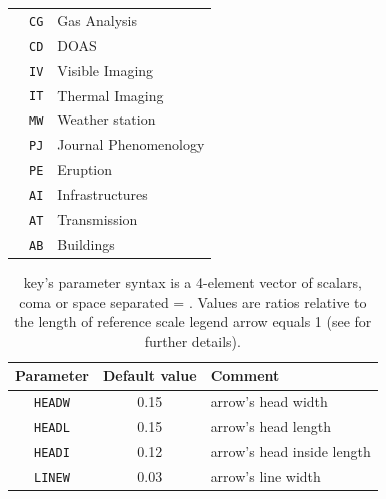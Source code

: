 \begin{table}
\begin{center}
\begin{tabular}{|c|c|l|}
      			             & \texttt{CG}	&	Gas Analysis\\
      			             & \texttt{CD}	&	DOAS\\
      			             & \texttt{IV}	&	Visible Imaging\\
      			             & \texttt{IT}	&	Thermal Imaging\\
      			             & \texttt{MW}	&	Weather station\\
      			             & \texttt{PJ}	&	Journal Phenomenology\\
      			             & \texttt{PE}	&	Eruption\\
      			             & \texttt{AI}	&	Infrastructures\\
      			             & \texttt{AT}	&	Transmission\\
      			             & \texttt{AB}	&	Buildings\\
\hline
\end{tabular}
\end{center}
\end{table}


\begin{table}
\caption{ key's parameter syntax is a 4-element vector of scalars, coma or space separated = . Values are ratios relative to the length of reference scale legend arrow equals 1 (see  for further details).}
\label{arrowshape}
\begin{center}
\begin{tabular}{|c|c|l|}
\hline
\textbf{Parameter} & \textbf{Default value} & \textbf{Comment}\\
\hline
\texttt{HEADW}	& 0.15	& arrow's head width\\
\hline
\texttt{HEADL}	& 0.15	& arrow's head length\\
\hline
\texttt{HEADI}	& 0.12	& arrow's head inside length\\
\hline
\texttt{LINEW}	& 0.03	& arrow's line width\\
\hline
\end{tabular}
\end{center}
\end{table}
